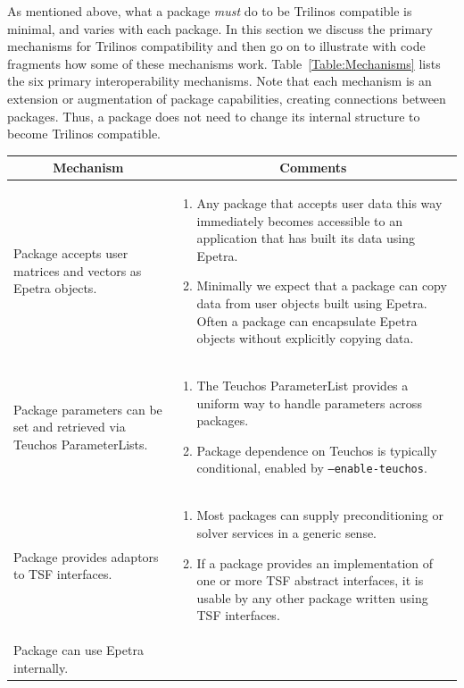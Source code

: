 \documentclass[acmtoms,acmnow]{acmtrans2m}
\begin{document}
As mentioned above, what a package {\it must} do to be Trilinos
compatible is minimal, and varies with each package.  In this section we
discuss the primary mechanisms for Trilinos compatibility
and then go on to illustrate with code fragments how some of these
mechanisms work.  Table~\ref{Table:Mechanisms} lists the six primary
interoperability mechanisms.
Note that each mechanism is an extension or augmentation of package
capabilities, creating connections between packages.  Thus, a package does 
not need to change its internal structure to become Trilinos compatible.
\begin{table}
\begin{center}
\begin{tabular}{|p{1.75in}|p{2.75in}|}\hline
\multicolumn{1}{|c|}{Mechanism} &
\multicolumn{1}{|c|}{Comments}\\\hline
Package accepts user matrices and vectors as Epetra objects. &  
\begin{enumerate}
\item Any package
that accepts user data this way immediately becomes accessible to an
application that has built its data using Epetra. 
\item Minimally we expect that a package can copy data from user
objects built using Epetra.  Often a package can encapsulate Epetra
objects without explicitly copying data.  
\end{enumerate} \\\hline
Package parameters can be set and retrieved via Teuchos ParameterLists. &
\begin{enumerate}
\item The Teuchos ParameterList provides a uniform way to handle parameters
across packages.  
\item Package dependence on Teuchos is typically
conditional, enabled by { \tt --enable-teuchos}. 
\end{enumerate}\\\hline 
Package provides adaptors to TSF interfaces. &
\begin{enumerate}
\item Most packages can supply preconditioning or solver services in a
generic sense.
\item If a package provides an implementation of one or more TSF
abstract interfaces, it is usable by any other package written using
TSF interfaces.
\end{enumerate}\\\hline
Package can use Epetra internally. &
\begin{enumerate}

\end{enumerate}
\end{tabular}
\end{center}
\end{table}
\end{document}
